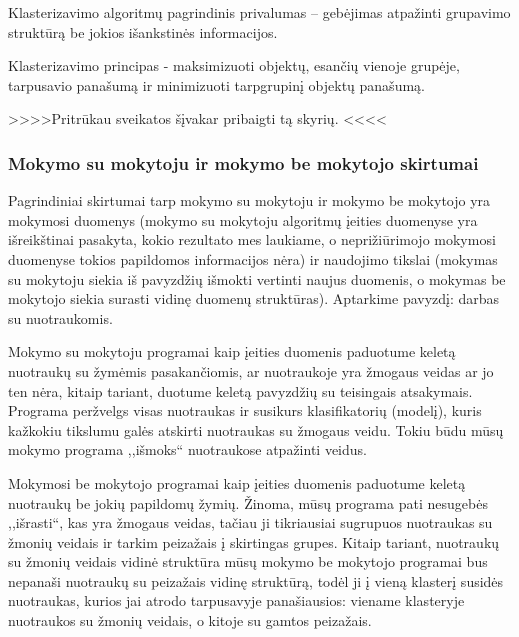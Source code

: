 Klasterizavimo algoritmų pagrindinis privalumas – gebėjimas atpažinti grupavimo
struktūrą be jokios išankstinės informacijos. 

Klasterizavimo principas - maksimizuoti objektų, esančių vienoje grupėje,
tarpusavio panašumą ir minimizuoti tarpgrupinį objektų panašumą.


{\centering>>>>Pritrūkau sveikatos šįvakar pribaigti tą skyrių. <<<< }




\subsubsection{Mokymo su mokytoju ir mokymo be mokytojo skirtumai}

Pagrindiniai skirtumai tarp mokymo su mokytoju ir mokymo be mokytojo yra
mokymosi duomenys (mokymo su mokytoju algoritmų įeities duomenyse yra
išreikštinai pasakyta, kokio rezultato mes laukiame, o neprižiūrimojo mokymosi
duomenyse tokios papildomos informacijos nėra) ir naudojimo tikslai (mokymas
su mokytoju siekia iš pavyzdžių išmokti vertinti naujus duomenis, o mokymas be
mokytojo siekia surasti vidinę duomenų struktūras). Aptarkime pavyzdį: darbas
su nuotraukomis.

Mokymo su mokytoju programai kaip įeities duomenis paduotume keletą 
nuotraukų su žymėmis pasakančiomis, ar nuotraukoje yra žmogaus veidas ar jo ten
nėra, kitaip tariant, duotume keletą pavyzdžių su teisingais atsakymais.
Programa peržvelgs visas nuotraukas ir susikurs klasifikatorių (modelį), kuris
kažkokiu tikslumu galės atskirti nuotraukas su žmogaus veidu. Tokiu būdu mūsų
mokymo programa ,,išmoks`` nuotraukose atpažinti veidus.

Mokymosi be mokytojo programai kaip įeities duomenis paduotume keletą
nuotraukų be jokių papildomų žymių. Žinoma, mūsų programa pati nesugebės
,,išrasti``, kas yra žmogaus veidas, tačiau ji tikriausiai sugrupuos nuotraukas
su žmonių veidais ir tarkim peizažais į skirtingas grupes. Kitaip tariant,
nuotraukų su žmonių veidais vidinė struktūra mūsų mokymo be mokytojo programai
bus nepanaši nuotraukų su peizažais vidinę struktūrą, todėl ji į vieną klasterį
susidės nuotraukas, kurios jai atrodo tarpusavyje panašiausios: viename
klasteryje nuotraukos su žmonių veidais, o kitoje su gamtos peizažais.

